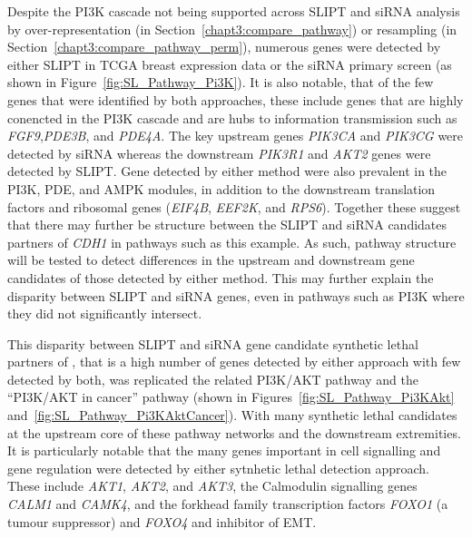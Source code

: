 \begin{figure*}[!htb]
\begin{mdframed}
  \begin{center}
  \resizebox{0.85 \textwidth}{!}{
    \fbox{
    \texttt{[image: \{"/home/tomkelly/Downloads/Pathway\_Structure/graph\_plot\_Pi3K\_exprSL\_2".pdf]}}
   }
   }
   \end{center}
   \caption[Synthetic Lethality in the PI3K Cascade]{\small \textbf{Synthetic Lethality in the PI3K Cascade.} The Reactome PI3K Cascade pathway with synthetic lethal candidates coloured as shown in the Legend.
}
\label{fig:SL_Pathway_Pi3K}
\end{mdframed}
\end{figure*}

Despite the \gls{PI3K} cascade not being supported across SLIPT and siRNA analysis by over-representation (in Section~\ref{chapt3:compare_pathway}) or resampling (in Section~\ref{chapt3:compare_pathway_perm}), numerous genes were detected by either \gls{SLIPT} in TCGA breast expression data or the \gls{siRNA} primary screen (as shown in Figure~\ref{fig:SL_Pathway_Pi3K}).  It is also notable, that of the few genes that were identified by both approaches, these include genes that are highly conencted in the PI3K cascade and are hubs to information transmission such as \textit{FGF9},\textit{PDE3B}, and \textit{PDE4A}. The key upstream genes \textit{PIK3CA} and \textit{PIK3CG} were detected by \gls{siRNA} whereas the downstream \textit{PIK3R1} and \textit{AKT2} genes were detected by \gls{SLIPT}. Gene detected by either method were also prevalent in the \gls{PI3K}, \gls{PDE}, and \gls{AMPK} modules, in addition to the downstream translation factors and ribosomal genes (\textit{EIF4B}, \textit{EEF2K}, and \textit{RPS6}). Together these suggest that there may further be structure between the \gls{SLIPT} and \gls{siRNA} candidates partners of \textit{CDH1} in pathways such as this example. As such, pathway structure will be tested to detect differences in the upstream and downstream gene candidates of those detected by either method. This may further explain the disparity between \gls{SLIPT} and \gls{siRNA} genes, even in pathways such as PI3K where they did not significantly intersect.

This disparity between \gls{SLIPT} and \gls{siRNA} gene candidate synthetic lethal partners of , that is a high number of genes detected by either approach with few detected by both, was replicated the related PI3K/AKT pathway and the ``PI3K/AKT in cancer'' pathway (shown in Figures~\ref{fig:SL_Pathway_Pi3KAkt} and~\ref{fig:SL_Pathway_Pi3KAktCancer}). With many synthetic lethal candidates at the upstream core of these pathway networks and the downstream extremities. It is particularly notable that the many genes important in cell signalling and gene regulation were detected by either sytnhetic lethal detection approach. These include \textit{AKT1}, \textit{AKT2}, and \textit{AKT3}, the Calmodulin signalling genes \textit{CALM1} and \textit{CAMK4}, and the forkhead family transcription factors \textit{FOXO1} (a tumour suppressor) and \textit{FOXO4} and inhibitor of \gls{EMT}.

